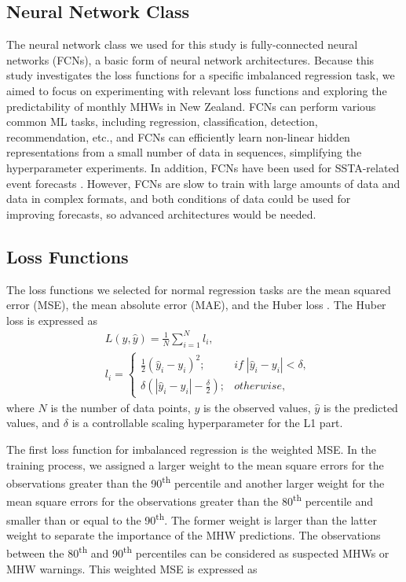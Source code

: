 \documentclass[11pt, a4paper]{article}
\begin{document}
\subsection{Neural Network Class}

The neural network class we used for this study is fully-connected neural networks (FCNs), a basic form of neural network architectures. Because this study investigates the loss functions for a specific imbalanced regression task, we aimed to focus on experimenting with relevant loss functions and exploring the predictability of monthly MHWs in New Zealand. FCNs can perform various common ML tasks, including regression, classification, detection, recommendation, etc., and FCNs can efficiently learn non-linear hidden representations from a small number of data in sequences, simplifying the hyperparameter experiments. In addition, FCNs have been used for SSTA-related event forecasts \citep{ratnam2020machine}. However, FCNs are slow to train with large amounts of data and data in complex formats, and both conditions of data could be used for improving forecasts, so advanced architectures would be needed.

\subsection{Loss Functions}

The loss functions we selected for normal regression tasks are the mean squared error (MSE), the mean absolute error (MAE), and the Huber loss \citep{huber1964robust}. The Huber loss is expressed as
\begin{align}
&L(y,\hat{y})= \frac{1}{N}\sum_{i=1}^N l_i,\\
&l_i=
  \begin{cases}
  \frac{1}{2}(\hat{y}_i-y_i)^2;
  & if\;|\hat{y}_i-y_i|<\delta,\\
  \delta(|\hat{y}_i-y_i|-\frac{\delta}{2});
  & otherwise,
\end{cases}
\end{align}
where $N$ is the number of data points, $y$ is the observed values, $\hat{y}$ is the predicted values, and $\delta$ is a controllable scaling hyperparameter for the L1 part.

The first loss function for imbalanced regression is the weighted MSE. In the training process, we assigned a larger weight to the mean square errors for the observations greater than the 90\textsuperscript{th} percentile and another larger weight for the mean square errors for the observations greater than the 80\textsuperscript{th} percentile and smaller than or equal to the 90\textsuperscript{th}. The former weight is larger than the latter weight to separate the importance of the MHW predictions. The observations between the 80\textsuperscript{th} and 90\textsuperscript{th} percentiles can be considered as suspected MHWs or MHW warnings. This weighted MSE is expressed as
\end{document}

